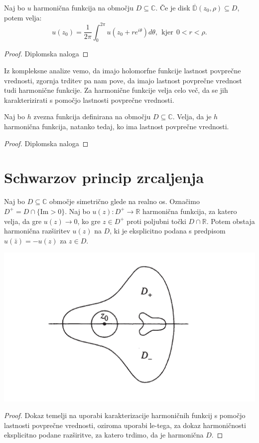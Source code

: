 \documentclass{article}
\begin{document}
    \begin{trditev}
        Naj bo $u$ harmonična funkcija na območju $D \subseteq \mathbb{C}$. Če je disk $\overline{\mathbb{D}}(z_0, \rho) \subseteq D$, potem velja:
            $$
                u(z_0) = \frac{1}{2 \pi} \int_{0}^{2 \pi}{u(z_0 + r e^{i \theta}) d\theta},~~\text{kjer}~~ 0 < r < \rho.
            $$
    \end{trditev}
    \begin{proof}
        Diplomska naloga
    \end{proof}
    \begin{op}
        Iz kompleksne analize vemo, da imajo holomorfne funkcije lastnost povprečne vrednosti, zgornja trditev pa nam pove, da imajo lastnost povprečne vrednost tudi harmonične funkcije. 
        Za harmonične funkcije velja celo več, da se jih karakterizirati s pomočjo lastnosti povprečne vrednosti. 
    \end{op}
    \begin{trditev}
        Naj bo $h$ zvezna funkcija definirana na območju $D \subseteq \mathbb{C}$. Velja, da je $h$ harmonična funkcija, natanko tedaj, ko ima lastnost povprečne vrednosti.
    \end{trditev}
    \begin{proof}
        Diplomska naloga
    \end{proof}

\section{Schwarzov princip zrcaljenja}
    \begin{izrek}
        Naj bo $D \subseteq \mathbb{C}$ območje simetrično glede na realno os. 
        Označimo $D^{+} = D \cap \{\text{Im} > 0\}$. 
        Naj bo $u(z): D^{+} \to \mathbb{R}$ harmonična funkcija, za katero velja, da gre $u(z) \to 0$, ko gre $z \in D^{+}$ proti poljubni točki $D \cap \mathbb{R}$. 
        Potem obstaja harmonična razširitev $u(z)$ na $D$, ki je eksplicitno podana s predpisom $u(\bar{z}) = - u(z)$ za $z \in D$.
    \end{izrek}
    \begin{center}
        \includegraphics[width = 0.7 \textwidth]{schwarzov_princip_zrcaljenja.png}
    \end{center}
    \begin{proof}
        Dokaz temelji na uporabi karakterizacije harmoničnih funkcij s pomočjo lastnosti povprečne vrednosti, oziroma uporabi le-tega, za dokaz harmoničnosti eksplicitno podane razširitve, za katero trdimo, da je harmonična $D$.
    \end{proof}

\begin{thebibliography}{9}

\end{thebibliography}
\end{document}
